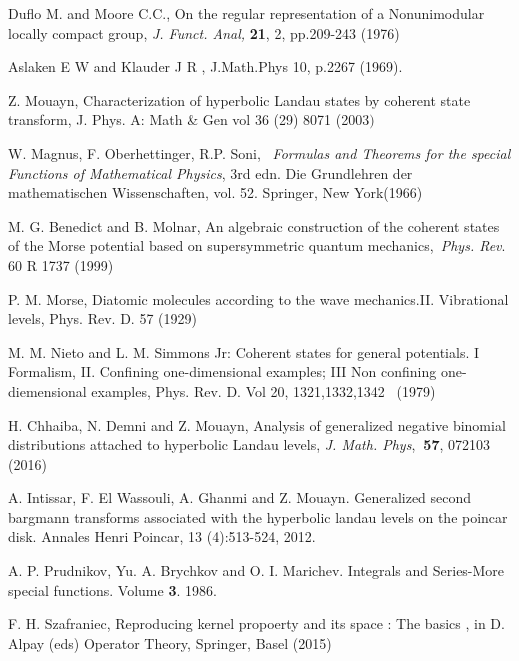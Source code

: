 \documentclass[12pt,reqno]{amsart}
\theoremstyle{definition}
\theoremstyle{remark}
\numberwithin{equation}{section}
\begin{document}
\begin{thebibliography}{99}
 Duflo M. and Moore C.C., On the regular representation of a
Nonunimodular locally compact group, \textit{J. Funct. Anal,} \textbf{21},
2, pp.209-243 (1976)

 Aslaken E W and Klauder J R , J.Math.Phys 10, p.2267 (1969).

 Z. Mouayn, Characterization of hyperbolic Landau states by
coherent state transform, J. Phys. A: Math \& Gen vol 36 (29) 8071 (2003$)$

 {W. Magnus, F. Oberhettinger, R.P. Soni}, \textit{\ Formulas
and Theorems for the special Functions of Mathematical Physics}, 3rd edn.
Die Grundlehren der mathematischen Wissenschaften, vol. 52. Springer, New
York(1966)

 M. G. Benedict and B. Molnar, An algebraic construction of the
coherent states of the Morse potential based on supersymmetric quantum
mechanics,\textit{\ Phys. Rev}. 60 R 1737 (1999)

 P. M. Morse, Diatomic molecules according to the wave
mechanics.II. Vibrational levels, Phys. Rev. D. 57 (1929)

 M. M. Nieto and L. M. Simmons Jr: Coherent states for general
potentials. I Formalism, II. Confining one-dimensional examples; III Non
confining one-diemensional examples, Phys. Rev. D. Vol 20, 1321,1332,1342 \
(1979)

 H. Chhaiba, N. Demni and Z. Mouayn, Analysis of generalized
negative binomial distributions attached to hyperbolic Landau levels, \emph{%
J. Math. Phys},\textbf{\ 57}, 072103 (2016)

 A. Intissar, F. El Wassouli, A. Ghanmi and Z. Mouayn.
Generalized second bargmann transforms associated with the hyperbolic landau
levels on the poincar disk. Annales Henri Poincar, 13 (4):513-524, 2012.

 A. P. Prudnikov, Yu. A. Brychkov and O. I. Marichev. Integrals
and Series-More special functions. Volume \textbf{3}. 1986.

 F. H. Szafraniec, Reproducing kernel propoerty and its space :
The basics , in D. Alpay (eds) Operator Theory, Springer, Basel (2015)
\end{thebibliography}
\end{document}
